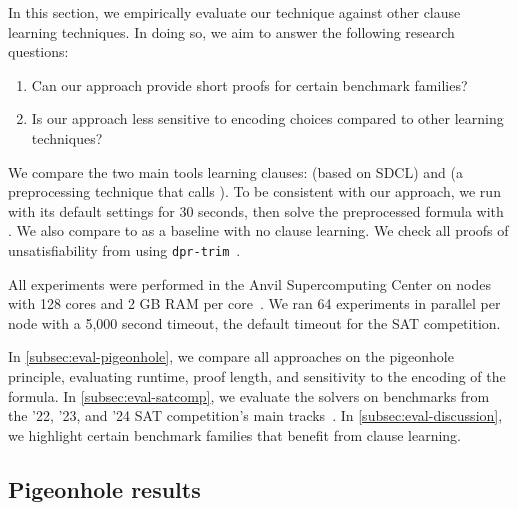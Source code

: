 In this section, we empirically evaluate our technique against other \pr clause
learning techniques. In doing so, we aim to answer the following research
questions:


\begin{enumerate}
    \item Can our approach provide short \pr proofs for certain benchmark
    families?
    \item Is our approach less sensitive to encoding choices compared to other
    \pr learning techniques?
\end{enumerate}


We compare the two main tools learning \pr clauses: \sadical (based on SDCL) and
\prelearn (a preprocessing technique that calls \sadical). To be consistent with
our approach, we run \prelearn with its default settings for 30 seconds, then
solve the preprocessed formula with \cadical. We also compare to \cadical as a
baseline with no \pr clause learning. We check all proofs of unsatisfiability
from \tool using \texttt{dpr-trim}~\cite{dpr-trim}.

All experiments were performed in the Anvil Supercomputing Center on nodes with
128 cores and 2 GB RAM per core~\cite{anvil}. We ran 64 experiments in parallel
per node with a 5,000 second timeout, the default timeout for the SAT
competition.

In \autoref{subsec:eval-pigeonhole}, we compare all approaches on the pigeonhole
principle, evaluating runtime, proof length, and sensitivity to the encoding of
the formula. In \autoref{subsec:eval-satcomp}, we evaluate the solvers on
benchmarks from the '22, '23, and '24 SAT competition's main
tracks~\cite{satcomp2022,satcomp2023,satcomp2024}. In
\autoref{subsec:eval-discussion}, we highlight certain benchmark families that
benefit from \pr clause learning.



\subsection{Pigeonhole results}~\label{subsec:eval-pigeonhole}


